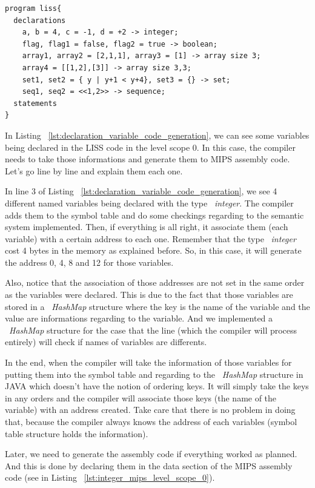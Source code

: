 \documentclass[
  oneside,
  11pt, a4paper,
  footinclude=true,
  headinclude=true,
  cleardoublepage=empty
]{scrbook}
\begin{document}
\begin{lstlisting}[caption={Example of creating variables in LISS},label={lst:declaration_variable_code_generation}]
program liss{
  declarations
    a, b = 4, c = -1, d = +2 -> integer;
    flag, flag1 = false, flag2 = true -> boolean;
    array1, array2 = [2,1,1], array3 = [1] -> array size 3;
    array4 = [[1,2],[3]] -> array size 3,3;
    set1, set2 = { y | y+1 < y+4}, set3 = {} -> set;
    seq1, seq2 = <<1,2>> -> sequence;
  statements
}
\end{lstlisting}

In Listing ~\ref{lst:declaration_variable_code_generation}, we can see some variables being declared in the LISS code in the level scope 0.
In this case, the compiler needs to take those informations and generate them to MIPS assembly code.
Let's go line by line and explain them each one.

In line 3 of Listing ~\ref{lst:declaration_variable_code_generation}, we see 4 different named variables being declared with the type ~\textit{integer}.
The compiler adds them to the symbol table and do some checkings regarding to the semantic system implemented. Then, if everything is all right, it associate them (each variable) with a certain address to each one. Remember that the type ~\textit{integer} cost 4 bytes in the memory as explained before. So, in this case, it will generate the address 0, 4, 8 and 12 for those variables.

Also, notice that the association of those addresses are not set in the same order as the variables were declared. This is due to the fact that those variables are stored in a ~\textit{HashMap} structure where the key is the name of the variable and the value are informations regarding to the variable. And we implemented a ~\textit{HashMap} structure for the case that the line (which the compiler will process entirely) will check if names of variables are differents.

In the end, when the compiler will take the information of those variables for putting them into the symbol table and regarding to the ~\textit{HashMap} structure in JAVA which doesn't have the notion of ordering keys. It will simply take the keys in any orders and the compiler will associate those keys (the name of the variable) with an address created. 
Take care that there is no problem in doing that, because the compiler always knows the address of each variables (symbol table structure holds the information).

Later, we need to generate the assembly code if everything worked as planned. And this is done by declaring them in the data section of the MIPS assembly code (see in Listing ~\ref{lst:integer_mips_level_scope_0}).
\end{document}
